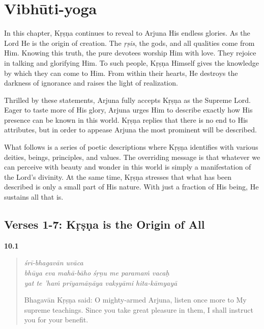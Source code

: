 \chapter{Vibhūti-yoga}\label{chap-vibhuti-yoga}

\noindent In this chapter, Kṛṣṇa continues to reveal to Arjuna His endless glories. As the Lord He is the origin of creation. The \textit{ṛṣis}, the gods, and all qualities come from Him. Knowing this truth, the pure devotees worship Him with love. They rejoice in talking and glorifying Him. To such people, Kṛṣṇa Himself gives the knowledge by which they can come to Him. From within their hearts, He destroys the darkness of ignorance and raises the light of realization.

Thrilled by these statements, Arjuna fully accepts Kṛṣṇa as the Supreme Lord. Eager to taste more of His glory, Arjuna urges Him to describe exactly how His presence can be known in this world. Kṛṣṇa replies that there is no end to His attributes, but in order to appease Arjuna the most prominent will be described.

What follows is a series of poetic descriptions where Kṛṣṇa identifies with various deities, beings, principles, and values. The overriding message is that whatever we can perceive with beauty and wonder in this world is simply a manifestation of the Lord’s divinity. At the same time, Kṛṣṇa stresses that what has been described is only a small part of His nature. With just a fraction of His being, He sustains all that is.

\section{Verses 1-7: Kṛṣṇa is the Origin of All}\label{sec-verses-1-7-krsna-is-the-origin-of-all}


\par\noindent\textbf{10.1}\par
\begin{verse}
\textit{śrī-bhagavān uvāca} \\
\textit{bhūya eva mahā-bāho śṛṇu me paramaṁ vacaḥ} \\
\textit{yat te ’haṁ prīyamāṇāya vakṣyāmi hita-kāmyayā}

\noindent Bhagavān Kṛṣṇa said: O mighty-armed Arjuna, listen once more to My supreme teachings. Since you take great pleasure in them, I shall instruct you for your benefit.
\end{verse}
\par



